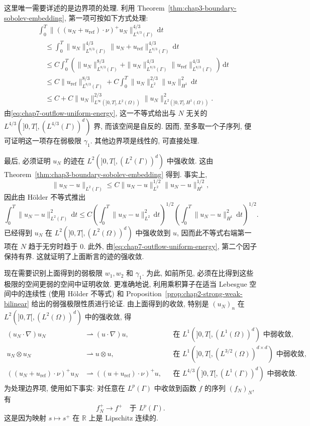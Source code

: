 \begin{sloppypar}
\begin{Proof}
这里唯一需要详述的是边界项的处理. 利用 Theorem~\ref{thm:chap3-boundary-sobolev-embedding}, 第一项可按如下方式处理:
\[
\begin{aligned}
 &\int_0^T\|((u_N+u_{\mathrm{ref}})\cdot\nu)^+u_N\|_{L^{4/3}(\Gamma)}^{4/3}\,\mathrm dt\\
 &\quad\leq\int_0^T\|u_N\|_{L^{8/3}(\Gamma)}^{4/3}
 \|u_N+u_{\mathrm{ref}}\|_{L^{8/3}(\Gamma)}^{4/3}\,\mathrm dt\\
 &\quad\leq C\int_0^T\left(\|u_N\|_{L^{8/3}(\Gamma)}^{8/3}
 +\|u_N\|_{L^{8/3}(\Gamma)}^{4/3}
 \|u_{\mathrm{ref}}\|_{L^{8/3}(\Gamma)}^{4/3}\right)\,\mathrm dt\\
 &\quad\leq C\|u_{\mathrm{ref}}\|_{L^{8/3}(\Gamma)}^{8/3}
 +C\int_0^T\|u_N\|_{L^2}^{2/3}\|u_N\|_{H^1}^2\,\mathrm dt\\
 &\quad\leq C+C\|u_N\|_{L^\infty(]0,T[,L^2(\Omega))}^{2/3}
 \|u_N\|_{L^2(]0,T[,H^1(\Omega))}^2.
\end{aligned}
\]
由\eqref{eq:chap7-outflow-uniform-energy}, 这一不等式给出与 $N$ 无关的
$L^{4/3}(]0,T[,(L^{4/3}(\Gamma))^d)$ 界, 而该空间是自反的. 因而, 至多取一个子序列, 便可证明这一项存在弱极限 $\gamma_1$. 其他边界项是线性的, 可直接处理.

最后, 必须证明 $u_N$ 的迹在 $L^2(]0,T[,(L^2(\Gamma))^d)$ 中强收敛. 这由 Theorem~\ref{thm:chap3-boundary-sobolev-embedding} 得到. 事实上,
\[
 \|u_N-u\|_{L^2(\Gamma)}
 \leq C\|u_N-u\|_{L^2}^{1/2}\|u_N-u\|_{H^1}^{1/2},
\]
因此由 H\"older 不等式推出
\[
 \int_0^T\|u_N-u\|_{L^2(\Gamma)}^2\,\mathrm dt
 \leq C\left(\int_0^T\|u_N-u\|_{L^2}^2\,\mathrm dt\right)^{1/2}
 \left(\int_0^T\|u_N-u\|_{H^1}^2\,\mathrm dt\right)^{1/2}.
\]
已经得到 $u_N$ 在 $L^2(]0,T[,(L^2(\Omega))^d)$ 中强收敛到 $u$, 因而此不等式右端第一项在 $N$ 趋于无穷时趋于 $0$. 此外, 由\eqref{eq:chap7-outflow-uniform-energy}, 第二个因子保持有界. 这就证明了上面断言的迹的强收敛.

现在需要识别上面得到的弱极限 $w_1,w_2$ 和 $\gamma_1$. 为此, 如前所见, 必须在比得到这些极限的空间更弱的空间中证明收敛. 更准确地说, 利用乘积算子在适当 Lebesgue 空间中的连续性 (使用 H\"older 不等式) 和 Proposition~\ref{prop:chap2-strong-weak-bilinear} 给出的弱强极限性质进行论证. 由上面得到的收敛, 特别是 $(u_N)_n$ 在 $L^2(]0,T[,(L^2(\Omega))^d)$ 中的强收敛, 得
\[
\begin{aligned}
 (u_N\cdot\nabla)u_N&\rightharpoonup(u\cdot\nabla)u,
 &&\text{在 }L^1(]0,T[,(L^1(\Omega))^d)\text{ 中弱收敛},\\
 u_N\otimes u_N&\rightharpoonup u\otimes u,
 &&\text{在 }L^1(]0,T[,(L^{3/2}(\Omega))^{d\times d})\text{ 中弱收敛},\\
 ((u_N+u_{\mathrm{ref}})\cdot\nu)^+u_N&\rightharpoonup
 ((u+u_{\mathrm{ref}})\cdot\nu)^+u,
 &&\text{在 }L^{4/3}(]0,T[,(L^1(\Gamma))^d)\text{ 中弱收敛}.
\end{aligned}
\]
为处理边界项, 使用如下事实: 对任意在 $L^p(\Gamma)$ 中收敛到函数 $f$ 的序列 $(f_N)_N$, 有
\[
 f_N^+\longrightarrow f^+\quad\text{于 }L^p(\Gamma).
\]
这是因为映射 $s\mapsto s^+$ 在 $\mathbb R$ 上是 Lipschitz 连续的.


\end{Proof}
\end{sloppypar}
